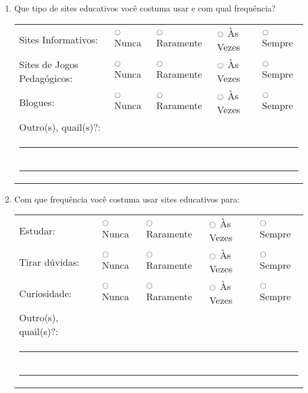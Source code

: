 \begin{enumerate}
\item Que tipo de sites educativos você costuma usar e com qual frequência? \\
\begin{tabular}{lllll}
	Sites Informativos: & $\ocircle$ Nunca & $\ocircle$ Raramente & $\ocircle$ Às Vezes & $\ocircle$ Sempre \\
	Sites de Jogos Pedagógicos: & $\ocircle$ Nunca & $\ocircle$ Raramente & $\ocircle$ Às Vezes & $\ocircle$ Sempre \\
	Blogues: & $\ocircle$ Nunca & $\ocircle$ Raramente & $\ocircle$ Às Vezes & $\ocircle$ Sempre \\
	Outro(s), quail(s)?: \\
	\multicolumn{5}{l}{\noindent\rule{\textwidth}{0.4pt}} \\
	\multicolumn{5}{l}{\noindent\rule{\textwidth}{0.4pt}} \\
\end{tabular}

\item Com que frequência você costuma usar sites educativos para: \\
\begin{tabular}{lllll}
	Estudar: & $\ocircle$ Nunca & $\ocircle$ Raramente & $\ocircle$ Às Vezes & $\ocircle$ Sempre \\
	Tirar dúvidas: & $\ocircle$ Nunca & $\ocircle$ Raramente & $\ocircle$ Às Vezes & $\ocircle$ Sempre \\
	Curiosidade: & $\ocircle$ Nunca & $\ocircle$ Raramente & $\ocircle$ Às Vezes & $\ocircle$ Sempre \\
	Outro(s), quail(s)?: \\
	\multicolumn{5}{l}{\noindent\rule{\textwidth}{0.4pt}} \\
	\multicolumn{5}{l}{\noindent\rule{\textwidth}{0.4pt}} \\
\end{tabular}

\end{enumerate}

